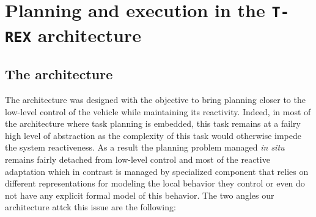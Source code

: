 \section{Planning and execution in the \texttt{T-REX} architecture}
\label{sec:arch}

\subsection{The \rx architecture}
\label{sec:arch:trex}

 
The \rx architecture was designed with the objective to bring planning
closer to the low-level control of the vehicle while maintaining its
reactivity. Indeed, in most of the architecture where task planning is
embedded, this task remains at a failry high level of abstraction as
the complexity of this task would otherwise impede the system
reactiveness. As a result the planning problem managed {\em in situ}
remains fairly detached from low-level control and most of the
reactive adaptation which in contrast is managed by specialized
component that relies on different representations for modeling the
local behavior they control or even do not have any explicit formal
model of this behavior. The two angles our architecture attck this
issue are the following:

